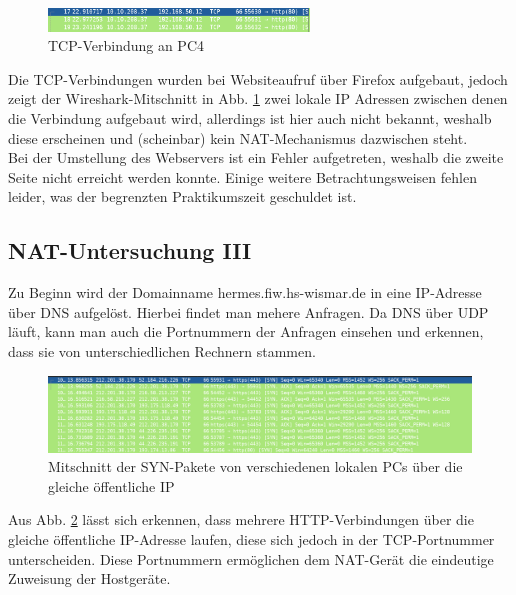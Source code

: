 \documentclass[11pt, a4paper]{article}
\begin{document}
\begin{figure}[H]
  \centering
  \includegraphics[width=0.618\textwidth]
  {graphics/bilder/32/bleppo}
  \caption{TCP-Verbindung an PC4}\label{ping_txcpp}
\end{figure}

Die TCP-Verbindungen wurden bei Websiteaufruf über Firefox aufgebaut, jedoch
zeigt der Wireshark-Mitschnitt in Abb. \ref{ping_txcpp} zwei lokale IP Adressen
zwischen denen die Verbindung aufgebaut wird, allerdings ist hier auch nicht
bekannt, weshalb diese erscheinen und (scheinbar) kein NAT-Mechanismus dazwischen
steht.\\

Bei der Umstellung des Webservers ist ein Fehler aufgetreten, weshalb die zweite
Seite nicht erreicht werden konnte. Einige weitere Betrachtungsweisen fehlen leider,
was der begrenzten Praktikumszeit geschuldet ist.


\subsection{NAT-Untersuchung III}
Zu Beginn wird der Domainname hermes.fiw.hs-wismar.de in eine IP-Adresse über
DNS aufgelöst. Hierbei findet man mehere Anfragen. Da DNS über UDP läuft, kann
man auch die Portnummern der Anfragen einsehen und erkennen, dass sie von
unterschiedlichen Rechnern stammen.\\

\begin{figure}[H]
  \centering
  \includegraphics[width=\textwidth]
  {graphics/bilder/33/ws_total}
  \caption{Mitschnitt der SYN-Pakete von verschiedenen lokalen PCs über die gleiche
    öffentliche IP
  }\label{33_ws_total}
\end{figure}

Aus Abb. \ref{33_ws_total} lässt sich erkennen, dass mehrere HTTP-Verbindungen
über die gleiche öffentliche IP-Adresse laufen, diese sich jedoch in der
TCP-Portnummer unterscheiden. Diese Portnummern ermöglichen dem NAT-Gerät die
eindeutige Zuweisung der Hostgeräte.\\
\end{document}
